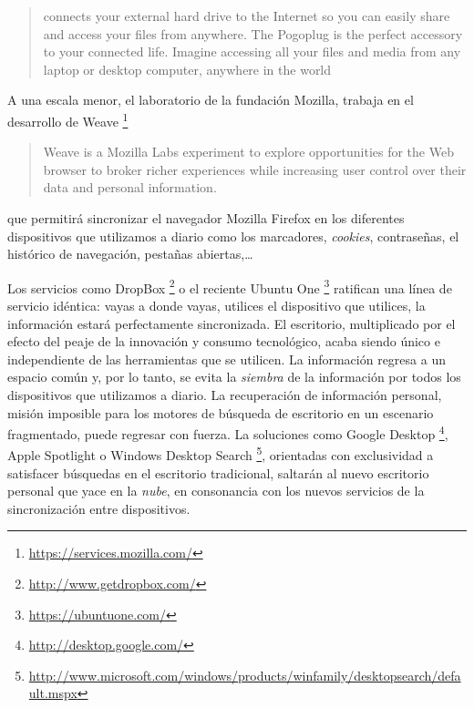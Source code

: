 \documentclass[12pt, a4paper,twoside]{book}
\begin{document}
\begin{quote}
connects your external hard drive to the Internet so you can easily
share and access your files from anywhere. The Pogoplug is the
perfect accessory to your connected life. Imagine accessing all
your files and media from any laptop or desktop computer, anywhere
in the world

\end{quote}
A una escala menor, el laboratorio de la fundación Mozilla, trabaja
en el desarrollo de Weave%
\footnote{\href{https://services.mozilla.com/}{https://services.mozilla.com/}}

\begin{quote}
Weave is a Mozilla Labs experiment to explore opportunities for the
Web browser to broker richer experiences while increasing user
control over their data and personal information.

\end{quote}
que permitirá sincronizar el navegador Mozilla Firefox en los
diferentes dispositivos que utilizamos a diario como los
marcadores, \emph{cookies}, contraseñas, el histórico de
navegación, pestañas abiertas,\ldots{}

Los servicios como DropBox%
\footnote{\href{http://www.getdropbox.com/}{http://www.getdropbox.com/}}
o el reciente Ubuntu One%
\footnote{\href{https://ubuntuone.com/}{https://ubuntuone.com/}}
ratifican una línea de servicio idéntica: vayas a donde vayas,
utilices el dispositivo que utilices, la información estará
perfectamente sincronizada. El escritorio, multiplicado por el
efecto del peaje de la innovación y consumo tecnológico, acaba
siendo único e independiente de las herramientas que se utilicen.
La información regresa a un espacio común y, por lo tanto, se evita
la \emph{siembra} de la información por todos los dispositivos que
utilizamos a diario. La recuperación de información personal,
misión imposible para los motores de búsqueda de escritorio en un
escenario fragmentado, puede regresar con fuerza. La soluciones
como Google Desktop%
\footnote{\href{http://desktop.google.com/}{http://desktop.google.com/}},
Apple Spotlight o Windows Desktop Search%
\footnote{\href{http://www.microsoft.com/windows/products/winfamily/desktopsearch/default.mspx}{http://www.microsoft.com/windows/products/winfamily/desktopsearch/default.mspx}},
orientadas con exclusividad a satisfacer búsquedas en el escritorio
tradicional, saltarán al nuevo escritorio personal que yace en la
\emph{nube}, en consonancia con los nuevos servicios de la
sincronización entre dispositivos.
\end{document}
